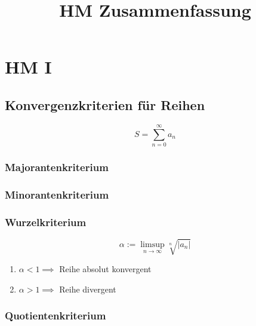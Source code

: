 \documentclass[]{article}
\title{HM Zusammenfassung}
\begin{document}
	\maketitle
	
	\section{HM I}
	
		\subsection{Konvergenzkriterien für Reihen}
			
			\begin{displaymath}
				S = \sum_{n=0}^{\infty} a_{n}
			\end{displaymath}
			
			\subsubsection{Majorantenkriterium}
			
			\subsubsection{Minorantenkriterium}
			
			\subsubsection{Wurzelkriterium}
				
				\begin{displaymath} 
					\alpha := \limsup\limits_{n \to \infty} \sqrt[n]{|a_{n}|}
				\end{displaymath}
				
				\begin{enumerate}[]
					\item
						\begin{math} \alpha < 1 \implies \end{math} Reihe absolut konvergent
					\item
						\begin{math} \alpha > 1 \implies \end{math} Reihe divergent
				\end{enumerate}
				
			\subsubsection{Quotientenkriterium}
			
\end{document}
